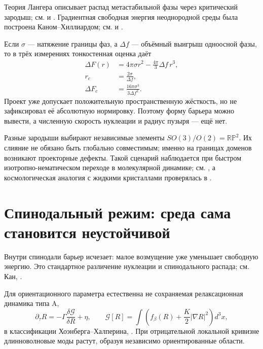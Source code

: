 Теория Лангера описывает распад метастабильной фазы через критический
зародыш; см.  и
. Градиентная свободная энергия
неоднородной среды была построена Каном--Хиллиардом; см.
 и .

Если $\sigma$ --- натяжение границы фаз, а $\Delta f$ --- объёмный
выигрыш одноосной фазы, то в трёх измерениях тонкостенная оценка даёт
\begin{align}
 \Delta F(r)&=4\pi\sigma r^2-\frac{4\pi}{3}\Delta f\,r^3,\\
 r_c&=\frac{2\sigma}{\Delta f},\\
 \Delta F_c&=\frac{16\pi\sigma^3}{3\Delta f^2}.
 \label{eq:v6-projective-thin-wall-nucleation}
\end{align}
Проект уже допускает положительную пространственную жёсткость, но не
зафиксировал её абсолютную нормировку. Поэтому форму барьера можно вывести,
а численную скорость нуклеации и радиус пузыря --- ещё нет.

Разные зародыши выбирают независимые элементы
$SO(3)/O(2)=\mathbb{RP}^2$. Их слияние не обязано быть глобально
совместимым; именно на границах доменов возникают проекторные дефекты.
Такой сценарий наблюдается при быстром изотропно-нематическом переходе в
молекулярной динамике; см. , а
космологическая аналогия с жидкими кристаллами проверялась в
.

\section{Спинодальный режим: среда сама становится неустойчивой}

Внутри спинодали барьер исчезает: малое возмущение уже уменьшает
свободную энергию. Это стандартное различение нуклеации и спинодального
распада; см. Кан, .

Для ориентационного параметра естественна не сохраняемая релаксационная
динамика типа A,
\begin{equation}
 \partial_\tau R
 =-\Gamma\frac{\delta\mathcal G}{\delta R}+\eta,
 \qquad
 \mathcal G[R]=\int\left(f_\beta(R)+\frac K2|\nabla R|^2\right)d^3x,
 \label{eq:v6-projective-model-a}
\end{equation}
в классификации Хоэнберга--Халперина,
. При отрицательной локальной кривизне
длинноволновые моды растут, образуя независимо ориентированные области.

